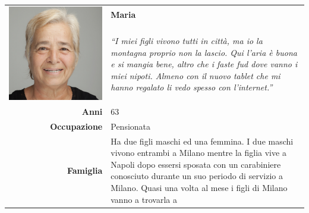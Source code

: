 \begin{table}[H]
	\begin{centering}
	\begin{tabular} { | r  p{12cm} | }
		\hline
		\multirow{2}{*}{
			\begin{minipage}{.15 \textheight}
				\vspace{0.1in}
				\includegraphics[width=\linewidth]{img/personas/maria.png}
			\end{minipage}
		}
	 	& \vspace{0.1 in}\Large\textbf{Maria} \\ 
		& \vspace{0.1 in}\large{\emph{``I miei figli vivono tutti in
città, ma io la montagna proprio non la lascio. Qui l'aria è buona e si
mangia bene, altro che i faste fud dove vanno i miei nipoti. Almeno con
il nuovo tablet che mi hanno regalato li vedo spesso con l'internet.''}}\\[8ex] 
		\hline
		\textbf{Anni} & 63 \\ \hline
		\textbf{Occupazione} & Pensionata \\ \hline
		\textbf{Famiglia} & Ha due figli maschi ed una femmina. I due
maschi vivono entrambi a Milano mentre la figlia vive a Napoli dopo
essersi sposata con un carabiniere conosciuto durante un suo periodo di servizio a
Milano. Quasi una volta al mese i figli di Milano vanno a trovarla a

\end{tabular}
\end{centering}
\end{table}
